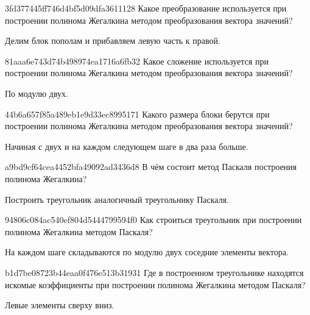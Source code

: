 \begin{note}{3fd377445ff746d4bf5d09dfa3611128}
    Какое преобразование используется при построении полинома Жегалкина методом преобразования вектора значений?

    \begin{cloze}{1}
        Делим блок пополам и прибавляем левую часть к правой.
    \end{cloze}
\end{note}

\begin{note}{81aaa6e743d74b498974ea1716a6fb32}
    Какое сложение используется при построении полинома Жегалкина методом преобразования вектора значений?

    \begin{cloze}{1}
        По модулю двух.
    \end{cloze}
\end{note}

\begin{note}{44b6a657f85a489eb1e9d33ec8995171}
    Какого размера блоки берутся при построении полинома Жегалкина методом преобразования вектора значений?

    \begin{cloze}{1}
        Начиная с двух и на каждом следующем шаге в два раза больше.
    \end{cloze}
\end{note}

\begin{note}{a9bd9cf64cea4452bfa49092ad3436d8}
    В чём состоит метод Паскаля построения полинома Жегалкина?

    \begin{cloze}{1}
        Построить треугольник аналогичный треугольнику Паскаля.
    \end{cloze}
\end{note}

\begin{note}{94806c084ac540ef804d5444799594f0}
    Как строиться треугольник при построении полинома Жегалкина методом Паскаля?

    \begin{cloze}{1}
        На каждом шаге складываются по модулю двух соседние элементы вектора.
    \end{cloze}
\end{note}

\begin{note}{b1d7be08723b44eaa0f476e513b31931}
    Где в построенном треугольнике находятся искомые коэффициенты при построении полинома Жегалкина методом Паскаля?

    \begin{cloze}{1}
        Левые элементы сверху вниз.
    \end{cloze}
\end{note}


